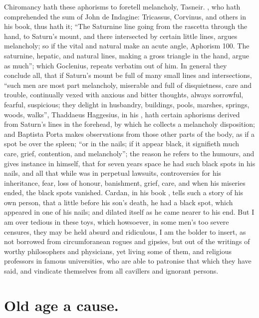 Chiromancy hath these aphorisms to foretell melancholy, Tasneir.
, who hath comprehended the sum of John de
Indagine: Tricassus, Corvinus, and others in his book, thus hath it;
\enquote{The Saturnine line going from the rascetta through the
hand, to Saturn's mount, and there intersected by certain little lines, argues
melancholy; so if the vital and natural make an acute angle, Aphorism 100. The
saturnine, hepatic, and natural lines, making a gross triangle in the hand,
argue as much}; which Goclenius,  repeats
verbatim out of him. In general they conclude all, that if Saturn's mount be
full of many small lines and intersections, \enquote{such men are
most part melancholy, miserable and full of disquietness, care and trouble,
continually vexed with anxious and bitter thoughts, always sorrowful, fearful,
suspicious; they delight in husbandry, buildings, pools, marshes, springs,
woods, walks}, \etc{} Thaddaeus Haggesius, in his
, hath certain aphorisms derived from
Saturn's lines in the forehead, by which he collects a melancholy disposition;
and Baptista Porta makes observations from those other
parts of the body, as if a spot be over the spleen; \enquote{or in
the nails; if it appear black, it signifieth much care, grief, contention, and
melancholy}; the reason he refers to the humours, and gives instance in
himself, that for seven years space he had such black spots in his nails, and
all that while was in perpetual lawsuits, controversies for his inheritance,
fear, loss of honour, banishment, grief, care, \etc{} and when his miseries
ended, the black spots vanished. Cardan, in his book , tells such a story of his own person, that a little before
his son's death, he had a black spot, which appeared in one of his nails; and
dilated itself as he came nearer to his end. But I am over tedious in these
toys, which howsoever, in some men's too severe censures, they may be held
absurd and ridiculous, I am the bolder to insert, as not borrowed from
circumforanean rogues and gipsies, but out of the writings of worthy
philosophers and physicians, yet living some of them, and religious professors
in famous universities, who are able to patronise that which they have said,
and vindicate themselves from all cavillers and ignorant persons.

\section{Old age a cause.}

